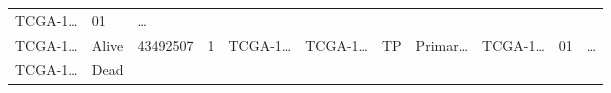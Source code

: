 \documentclass[
]{article}
\begin{document}
\begin{longtable}[]{@{}lllllllllll@{}}
\begin{minipage}[t]{0.09\columnwidth}
TCGA-1\ldots{}\strut
\end{minipage} & \begin{minipage}[t]{0.10\columnwidth}\raggedright
01\strut
\end{minipage} & \begin{minipage}[t]{0.03\columnwidth}\raggedright
\ldots{}\strut
\end{minipage}\tabularnewline
\begin{minipage}[t]{0.07\columnwidth}\raggedright
TCGA-1\ldots{}\strut
\end{minipage} & \begin{minipage}[t]{0.04\columnwidth}\raggedright
Alive\strut
\end{minipage} & \begin{minipage}[t]{0.06\columnwidth}\raggedright
43492507\strut
\end{minipage} & \begin{minipage}[t]{0.07\columnwidth}\raggedright
1\strut
\end{minipage} & \begin{minipage}[t]{0.07\columnwidth}\raggedright
TCGA-1\ldots{}\strut
\end{minipage} & \begin{minipage}[t]{0.07\columnwidth}\raggedright
TCGA-1\ldots{}\strut
\end{minipage} & \begin{minipage}[t]{0.07\columnwidth}\raggedright
TP\strut
\end{minipage} & \begin{minipage}[t]{0.07\columnwidth}\raggedright
Primar\ldots{}\strut
\end{minipage} & \begin{minipage}[t]{0.09\columnwidth}\raggedright
TCGA-1\ldots{}\strut
\end{minipage} & \begin{minipage}[t]{0.10\columnwidth}\raggedright
01\strut
\end{minipage} & \begin{minipage}[t]{0.03\columnwidth}\raggedright
\ldots{}\strut
\end{minipage}\tabularnewline
\begin{minipage}[t]{0.07\columnwidth}\raggedright
TCGA-1\ldots{}\strut
\end{minipage} & \begin{minipage}[t]{0.04\columnwidth}\raggedright
Dead\strut
\end{minipage} & \begin{minipage}[t]{0.06\columnwidth}\raggedright

\end{minipage}
\end{longtable}
\end{document}
